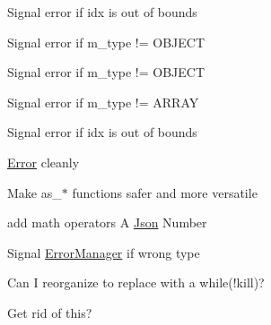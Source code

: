 \begin{DoxyRefList}
Signal error if idx is out of bounds  
\item[\label{todo__todo000017}%
\Hypertarget{todo__todo000017}%
Member \hyperlink{classnta_1_1utils_1_1Json_adf2d340a2bf7d59c537e398a1be66cf7}{nta\+:\+:utils\+:\+:Json\+:\+:operator\mbox{[}\mbox{]}} (crstring key)]Signal error if m\+\_\+type != O\+B\+J\+E\+CT  
\item[\label{todo__todo000018}%
\Hypertarget{todo__todo000018}%
Member \hyperlink{classnta_1_1utils_1_1Json_ab3b51a07ebed90330c98fd8e20785781}{nta\+:\+:utils\+:\+:Json\+:\+:operator\mbox{[}\mbox{]}} (crstring key) const]Signal error if m\+\_\+type != O\+B\+J\+E\+CT  
\item[\label{todo__todo000019}%
\Hypertarget{todo__todo000019}%
Member \hyperlink{classnta_1_1utils_1_1Json_a236b5885612b74c21fbad169b21eaf55}{nta\+:\+:utils\+:\+:Json\+:\+:operator\mbox{[}\mbox{]}} (std\+::size\+\_\+t idx)]Signal error if m\+\_\+type != A\+R\+R\+AY 

Signal error if idx is out of bounds  
\item[\label{todo__todo000024}%
\Hypertarget{todo__todo000024}%
Member \hyperlink{classnta_1_1utils_1_1Json_a905d67b125a7aadd771bb74a1bb63f34}{nta\+:\+:utils\+:\+:Json\+:\+:tokenize} (std\+::string curr)]\hyperlink{structnta_1_1Error}{Error} cleanly  
\item[\label{todo__todo000005}%
\Hypertarget{todo__todo000005}%
Class \hyperlink{classnta_1_1utils_1_1JsonNum}{nta\+:\+:utils\+:\+:Json\+Num} ]Make as\+\_\+$\ast$ functions safer and more versatile 

add math operators A \hyperlink{classnta_1_1utils_1_1Json}{Json} Number  
\item[\label{todo__todo000007}%
\Hypertarget{todo__todo000007}%
Member \hyperlink{classnta_1_1utils_1_1JsonNum_a89e8033a247c3342d99a762f6110d877}{nta\+:\+:utils\+:\+:Json\+Num\+:\+:as\+\_\+uint} () const]Signal \hyperlink{classnta_1_1ErrorManager}{Error\+Manager} if wrong type  
\item[\label{todo__todo000029}%
\Hypertarget{todo__todo000029}%
Member \hyperlink{classnta_1_1utils_1_1ThreadPool_a2ca98ba5ed4510e5aac90c0507859b8d}{nta\+:\+:utils\+:\+:Thread\+Pool\+:\+:dispatcher} ()]Can I reorganize to replace with a while(!kill)?  
\item[\label{todo__todo000031}%
\Hypertarget{todo__todo000031}%
Member \hyperlink{classnta_1_1Window_aa144f6bb014aaad3c91c3f3e6ad56f9c}{nta\+:\+:Window\+:\+:screenshot} () const]Get rid of this? 
\end{DoxyRefList}